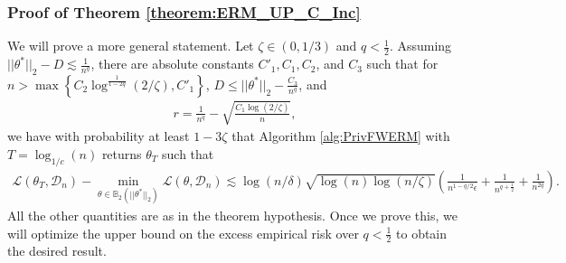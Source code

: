 \documentclass{article}
\begin{document}

\subsubsection{Proof of Theorem \ref{theorem:ERM_UP_C_Inc}}
\label{AppThmERM2}

We will prove a more general statement. Let $\zeta \in (0, 1/3)$ and $q < \frac{1}{2}$. Assuming $||\theta^*||_2 - D \lesssim \frac{1}{n^q}$, there are absolute constants $C'_1, C_1, C_2$, and $C_3$ such that for $n > \max\left\{C_2\log^{\frac{1}{1 - 2q}}(2/\zeta), C'_1\right\}$, $D \leq ||\theta^*||_2 - \frac{C_3}{n^q}$, and
\begin{align*}
r = \frac{1}{n^q} - \sqrt{\frac{C_1\log(2/\zeta)}{n}},
\end{align*}
we have with probability at least $1 - 3\zeta$ that Algorithm \ref{alg:PrivFWERM} with $T = \log_{1/c}(n)$ returns $\theta_T$ such that
\begin{align}
\label{eq:General_q_Inc_C}
\mathcal{L}(\theta_T, \mathcal{D}_n) - \mathop{\min}\limits_{\theta \in \mathbb{B}_2(||\theta^*||_2)}\mathcal{L}(\theta, \mathcal{D}_n) \lesssim \log(n/\delta)\sqrt{\log(n)\log(n/\zeta)}\left(\frac{1}{{n^{1 - q/2}\epsilon}} + \frac{1}{n^{q + \frac{1}{2}}} + \frac{1}{n^{2q}}\right).
\end{align}
All the other quantities are as in the theorem hypothesis. Once we prove this, we will optimize the upper bound on the excess empirical risk over $q < \frac{1}{2}$ to obtain the desired result.
\end{document}
